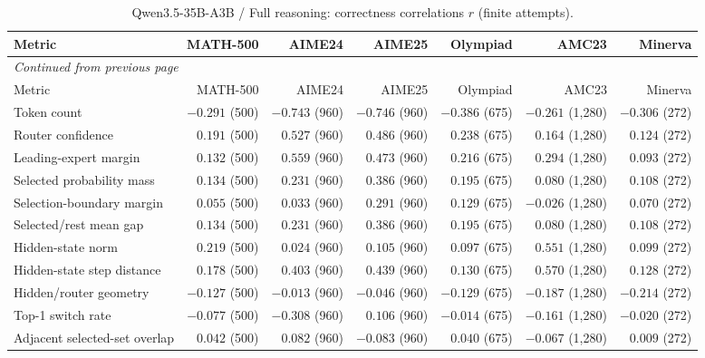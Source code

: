 \begingroup\scriptsize\setlength{\tabcolsep}{4pt}
\begin{longtable}{@{}lrrrrrr@{}}
\caption{Qwen3.5-35B-A3B / Full reasoning: correctness correlations $r$ (finite attempts).}\label{tab:multi-qwen-reasoning}\\
\toprule
Metric & MATH-500 & AIME24 & AIME25 & Olympiad & AMC23 & Minerva \\
\midrule\endfirsthead
\multicolumn{7}{l}{\textit{Continued from previous page}}\\
\toprule
Metric & MATH-500 & AIME24 & AIME25 & Olympiad & AMC23 & Minerva \\
\midrule\endhead
\bottomrule\endfoot
Token count & $-0.291$ (500) & $-0.743$ (960) & $-0.746$ (960) & $-0.386$ (675) & $-0.261$ (1,280) & $-0.306$ (272) \\
Router confidence & $0.191$ (500) & $0.527$ (960) & $0.486$ (960) & $0.238$ (675) & $0.164$ (1,280) & $0.124$ (272) \\
Leading-expert margin & $0.132$ (500) & $0.559$ (960) & $0.473$ (960) & $0.216$ (675) & $0.294$ (1,280) & $0.093$ (272) \\
Selected probability mass & $0.134$ (500) & $0.231$ (960) & $0.386$ (960) & $0.195$ (675) & $0.080$ (1,280) & $0.108$ (272) \\
Selection-boundary margin & $0.055$ (500) & $0.033$ (960) & $0.291$ (960) & $0.129$ (675) & $-0.026$ (1,280) & $0.070$ (272) \\
Selected/rest mean gap & $0.134$ (500) & $0.231$ (960) & $0.386$ (960) & $0.195$ (675) & $0.080$ (1,280) & $0.108$ (272) \\
Hidden-state norm & $0.219$ (500) & $0.024$ (960) & $0.105$ (960) & $0.097$ (675) & $0.551$ (1,280) & $0.099$ (272) \\
Hidden-state step distance & $0.178$ (500) & $0.403$ (960) & $0.439$ (960) & $0.130$ (675) & $0.570$ (1,280) & $0.128$ (272) \\
Hidden/router geometry & $-0.127$ (500) & $-0.013$ (960) & $-0.046$ (960) & $-0.129$ (675) & $-0.187$ (1,280) & $-0.214$ (272) \\
Top-1 switch rate & $-0.077$ (500) & $-0.308$ (960) & $0.106$ (960) & $-0.014$ (675) & $-0.161$ (1,280) & $-0.020$ (272) \\
Adjacent selected-set overlap & $0.042$ (500) & $0.082$ (960) & $-0.083$ (960) & $0.040$ (675) & $-0.067$ (1,280) & $0.009$ (272) \\
\end{longtable}\endgroup

